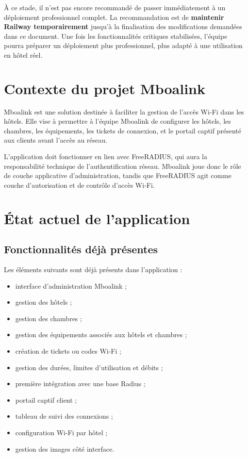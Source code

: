 \documentclass[12pt,a4paper]{article}
\begin{document}
À ce stade, il n'est pas encore recommandé de passer immédiatement à un déploiement professionnel complet. La recommandation est de \textbf{maintenir Railway temporairement} jusqu'à la finalisation des modifications demandées dans ce document. Une fois les fonctionnalités critiques stabilisées, l'équipe pourra préparer un déploiement plus professionnel, plus adapté à une utilisation en hôtel réel.

\section{Contexte du projet Mboalink}

Mboalink est une solution destinée à faciliter la gestion de l'accès Wi-Fi dans les hôtels. Elle vise à permettre à l'équipe Mboalink de configurer les hôtels, les chambres, les équipements, les tickets de connexion, et le portail captif présenté aux clients avant l'accès au réseau.

L'application doit fonctionner en lien avec FreeRADIUS, qui aura la responsabilité technique de l'authentification réseau. Mboalink joue donc le rôle de couche applicative d'administration, tandis que FreeRADIUS agit comme couche d'autorisation et de contrôle d'accès Wi-Fi.

\section{État actuel de l'application}

\subsection{Fonctionnalités déjà présentes}

Les éléments suivants sont déjà présents dans l'application :

\begin{itemize}
  \item interface d'administration Mboalink ;
  \item gestion des hôtels ;
  \item gestion des chambres ;
  \item gestion des équipements associés aux hôtels et chambres ;
  \item création de tickets ou codes Wi-Fi ;
  \item gestion des durées, limites d'utilisation et débits ;
  \item première intégration avec une base Radius ;
  \item portail captif client ;
  \item tableau de suivi des connexions ;
  \item configuration Wi-Fi par hôtel ;
  \item gestion des images côté interface.
\end{itemize}
\end{document}
